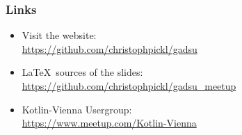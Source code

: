 


\begin{frame}\frametitle{Links}

\begin{itemize}
	\item Visit the website: \\ \href{https://github.com/christophpickl/gadsu}{https://github.com/christophpickl/gadsu}
	\item \LaTeX~sources of the slides: \\ \href{https://github.com/christophpickl/gadsu_meetup}{https://github.com/christophpickl/gadsu\_meetup}
	\item Kotlin-Vienna Usergroup: \\ \href{https://www.meetup.com/Kotlin-Vienna}{https://www.meetup.com/Kotlin-Vienna}
	
\end{itemize}

\end{frame}

